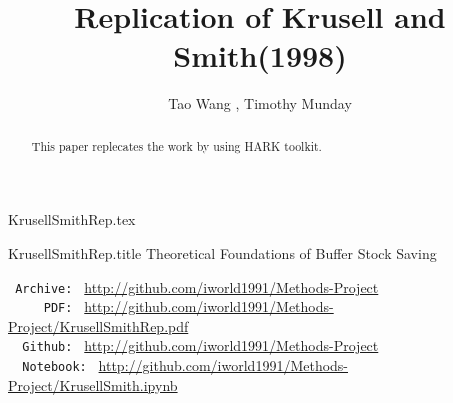 \documentclass[titlepage]{\econtex}\providecommand{\texname}{KrusellSmithRep}%
\newcommand{\onlyinsubfile}[1]{#1}\newcommand{\notinsubfile}[1]{} %
\begin{document}

\renewcommand{\onlyinsubfile}[1]{}\renewcommand{\notinsubfile}[1]{#1} %

\hfill{\tiny \texname.tex}

\begin{verbatimwrite}{\texname.title}
Theoretical Foundations of Buffer Stock Saving
\end{verbatimwrite}


\title{Replication of Krusell and Smith(1998)}

\author{Tao Wang \authNum,
Timothy Munday \authNum}



\maketitle



\begin{abstract}
  This paper replecates the work by \cite{krusell1998income} using HARK toolkit. 
\end{abstract}

\begin{small}
\parbox{\textwidth}{
\begin{center}
\begin{tabbing}
\texttt{~Archive:~} \= \= \url{http://github.com/iworld1991/Methods-Project} \kill \\  %
\texttt{~~~~~PDF:~} \> \> \url{http://github.com/iworld1991/Methods-Project/KrusellSmithRep.pdf}    \\
\texttt{~~Github:~} \> \> \url{http://github.com/iworld1991/Methods-Project} \\
\texttt{~~Notebook:~} \> \> \url{http://github.com/iworld1991/Methods-Project/KrusellSmith.ipynb} 

\end{tabbing}
\end{center}
}
\end{small}


\begin{authorsinfo}
\end{authorsinfo}
\end{document}
